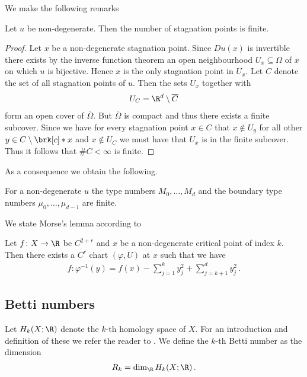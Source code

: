 We make the following remarks
\begin{proposition}
  Let $u$ be non-degenerate. Then the number of
  stagnation points is finite.
\end{proposition}
\begin{proof}
  Let $x$ be a non-degenerate stagnation point. Since $Du(x)$ is invertible there exists
  by the inverse function theorem an open neighbourhood $U_x\subseteq\Omega$ of $x$ on which 
  $u$ is bijective. Hence $x$ is the only stagnation point in $U_x$. Let $C$ denote the set of all
  stagnation points of $u$. Then the sets $U_x$ together with
  \begin{align}
    U_C=\R^d\setminus \overline{C}
  \end{align}
  form an open cover of $\overline{\Omega}$. But $\overline{\Omega}$ is compact and thus there exists
  a finite subcover. Since we have for every stagnation point $x\in C$ that
  $x\not\in U_y$ for all other $y\in C\setminus\brk[c]*{x}$ and $x\not\in U_C$ we must have that $U_x$
  is in the finite subcover. Thus it follows that $\#C<\infty$ is finite.
\end{proof}
As a consequence we obtain the following.
\begin{corollary}
  For a non-degenerate $u$ the type numbers $M_0,\dots,M_d$ and the boundary type numbers $\mu_0,\dots,\mu_{d-1}$
  are finite.
\end{corollary}


We state Morse's lemma according to \cite[p.145]{Hirsch1994}
\begin{lemma}
  Let $f\colon X\to\R$ be $C^{2+r}$ and $x$ be a non-degenerate
  critical point of index $k$. Then there exists a $C^r$ chart $(\varphi,U)$ at $x$
  such that we have
  \begin{align*}
    f\colon\varphi^{-1}(y)=f(x)-\sum_{j=1}^ky_j^2+\sum_{j=k+1}^dy_j^2\,.
  \end{align*}
\end{lemma}

\subsection{Betti numbers}

Let $H_k(X;\R)$ denote the $k$-th homology space of $X$.
For an introduction and definition of these we refer the reader to \cite[Chapter 2]{Hatcher2002}.
We define the $k$-th Betti number as the dimension
\begin{align}
  R_k=\dim_\R H_k(X;\R)\,.\label{eq:df_bettiNbrs}
\end{align}

